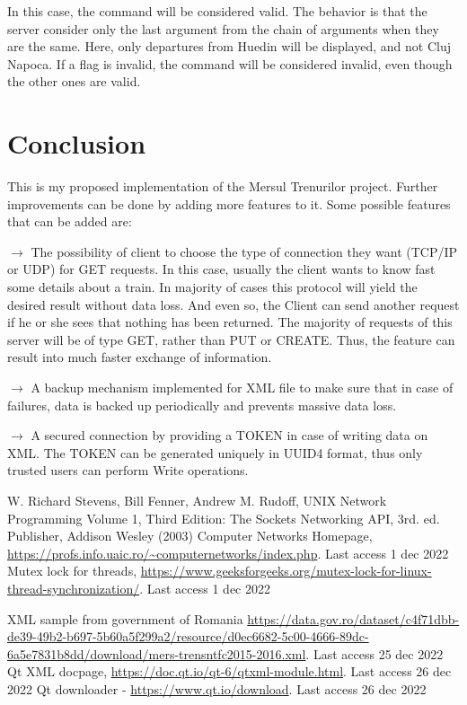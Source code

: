 \documentclass[runningheads]{llncs}
\begin{document}
In this case, the command will be considered valid. The behavior is that the server consider only the last argument from the chain of arguments when they are the same. Here, only departures from Huedin will be displayed, and not Cluj Napoca. If a flag is invalid, the command will be considered invalid, even though the other ones are valid.



\section{Conclusion}
This is my proposed implementation of the Mersul Trenurilor project. Further improvements can be done by adding more features to it. Some possible features that can be added are:

$\rightarrow$ The possibility of client to choose the type of connection they want (TCP/IP or UDP) for GET requests. In this case, usually the client wants to know fast some details about a train. In majority of cases this protocol will yield the desired result without data loss. And even so, the Client can send another request if he or she sees that nothing has been returned. The majority of requests of this server will be of type GET, rather than PUT or CREATE. Thus, the feature can result into much faster exchange of information.

$\rightarrow$ A backup mechanism implemented for XML file to make sure that in case of failures, data is backed up periodically and prevents massive data loss.

$\rightarrow$ A secured connection by providing a TOKEN in case of writing data on XML. The TOKEN can be generated uniquely in UUID4 format, thus only trusted users can perform Write operations.


\begin{thebibliography}{8}

W. Richard Stevens, Bill Fenner, Andrew M. Rudoff,
UNIX Network Programming Volume 1, Third Edition: The Sockets Networking API, 3rd. ed. Publisher,
Addison Wesley (2003)
Computer Networks Homepage, \url{https://profs.info.uaic.ro/~computernetworks/index.php}. Last access 1 dec 2022
 Mutex lock for threads, \url{https://www.geeksforgeeks.org/mutex-lock-for-linux-thread-synchronization/}. Last access 1 dec 2022

 XML sample from government of Romania \url{https://data.gov.ro/dataset/c4f71dbb-de39-49b2-b697-5b60a5f299a2/resource/d0ec6682-5c00-4666-89dc-6a5e7831b8dd/download/mers-trensntfc2015-2016.xml}. Last access 25 dec 2022
Qt XML docpage, \url{https://doc.qt.io/qt-6/qtxml-module.html}. Last access 26 dec 2022
Qt downloader - \url{https://www.qt.io/download}. Last access 26 dec 2022
\end{thebibliography}
\end{document}
